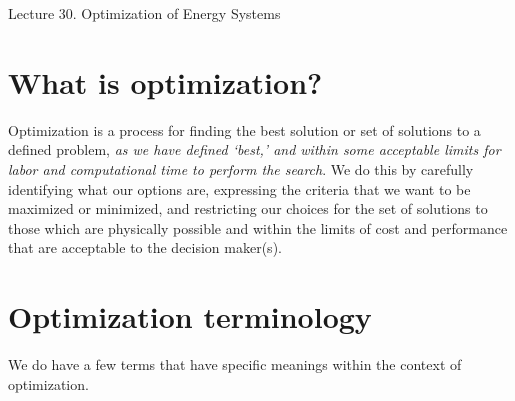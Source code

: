 \documentclass[10pt]{article}
\begin{document}
   \noindent
   \begin{center}

   \hrulefill
   
   \vspace{5pt}
   
   \vspace{0pt}
   
   {\Large \hfill  Lecture 30.  
Optimization of Energy Systems}
   \vspace{5pt}
   
  
   \hrulefill
   \end{center}

 {}

\section{What is optimization?}

Optimization is a process for finding the best solution or set of solutions to a defined problem, \emph {as we have defined `best,' and within some acceptable limits for labor and computational time to perform the search}. %
We do this by carefully identifying what our options are, expressing the criteria that we want to be maximized or minimized, and restricting our choices for the set of solutions to those which are physically possible and within the limits of cost and performance that are acceptable to the decision maker(s).

\section{Optimization terminology}

We do have a few terms that have specific meanings within the context of optimization.
\end{document}
